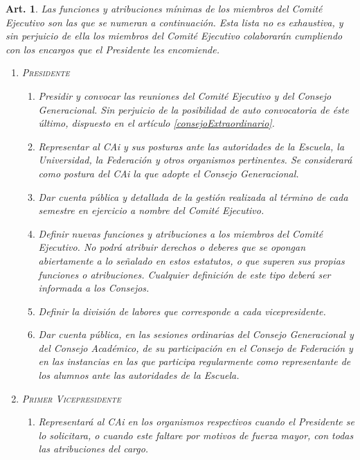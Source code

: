 \documentclass[letterpaper,11pt]{article}
\theoremstyle{plain}
\newtheorem{art}{Art.} %
\newcommand{\aref}[1]{\hyperref[#1]{\ref*{#1}}}
\begin{document}
		\begin{art}%
			Las funciones y atribuciones mínimas de los miembros del Comité Ejecutivo son las que se numeran a continuación. Esta lista no es exhaustiva, y sin perjuicio de ella los miembros del Comité Ejecutivo colaborarán cumpliendo con los encargos que el Presidente les encomiende.
			\begin{enumerate}
				\item \label{funciones_presidente}\textsc{Presidente}
					\begin{enumerate}
						\item Presidir y convocar las reuniones del Comité Ejecutivo y del Consejo Generacional. Sin perjuicio de la posibilidad de auto convocatoria de éste último, dispuesto en el artículo \aref{consejoExtraordinario}.
						
						\item Representar al CAi y sus posturas ante las autoridades de la Escuela, la Universidad, la Federación y otros organismos pertinentes. Se considerará como postura del CAi la que adopte el Consejo Generacional.
						
						\item Dar cuenta pública y detallada de la gestión realizada al término de cada semestre en ejercicio a nombre del Comité Ejecutivo.
						
						\item Definir nuevas funciones y atribuciones a los miembros del Comité Ejecutivo. No podrá atribuir derechos o deberes que se opongan abiertamente a lo señalado en estos estatutos, o que superen sus propias funciones o atribuciones. Cualquier definición de este tipo deberá ser informada a los Consejos.
						
						\item Definir la división de labores que corresponde a cada vicepresidente.
						
						\item Dar cuenta pública, en las sesiones ordinarias del Consejo Generacional y del Consejo Académico, de su participación en el Consejo de Federación y en las instancias en las que participa regularmente como representante de los alumnos ante las autoridades de la Escuela.
					\end{enumerate}

				\item \textsc{Primer Vicepresidente}
					\begin{enumerate}
						\item Representará al CAi en los organismos respectivos cuando el Presidente se lo solicitara, o cuando este faltare por motivos de fuerza mayor, con todas las atribuciones del cargo.
						

\end{enumerate}
\end{enumerate}
\end{art}
\end{document}
